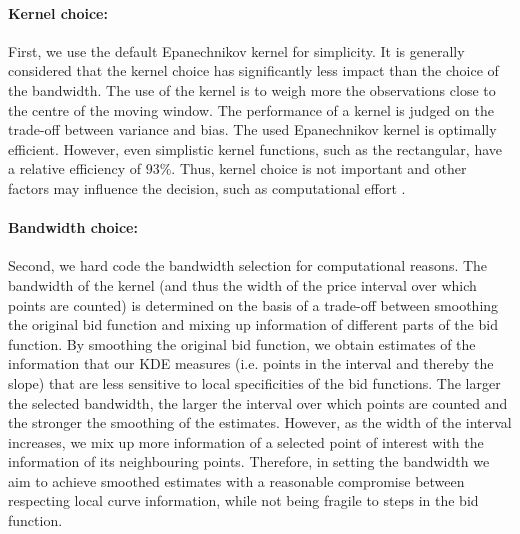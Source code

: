 \begin{subappendices}
\paragraph{Kernel choice:}
First, we use the default Epanechnikov kernel for simplicity. It is generally considered that the kernel choice has significantly less impact than the choice of the bandwidth. The use of the kernel is to weigh more the observations close to the centre of the moving window. The performance of a kernel is judged on the trade-off between variance and bias. The used Epanechnikov kernel is optimally efficient. However, even simplistic kernel functions, such as the rectangular, have a relative efficiency of $93\%$. Thus, kernel choice is not important and other factors may influence the decision, such as computational effort \cite{salgado1994exploring, silverman1986density}. 

\paragraph{Bandwidth choice:}
Second, we hard code the bandwidth selection for computational reasons. The bandwidth of the kernel (and thus the width of the price interval over which points are counted) is determined on the basis of a trade-off between 
smoothing the original bid function and mixing up information of different parts of the bid function. By smoothing the original bid function, we obtain estimates of the information that our KDE measures (i.e. points in the interval and thereby the slope) that are less sensitive to local specificities of the bid functions. The larger the selected bandwidth, the larger the interval over which points are counted and  the stronger the smoothing of the estimates. However, as the width of the interval increases, we mix up more information of a selected point of interest with the information of its neighbouring points. Therefore, in setting the bandwidth we aim to achieve smoothed estimates  with a reasonable compromise between respecting local curve information, while not being fragile to steps in the bid function. \\



\end{subappendices}
